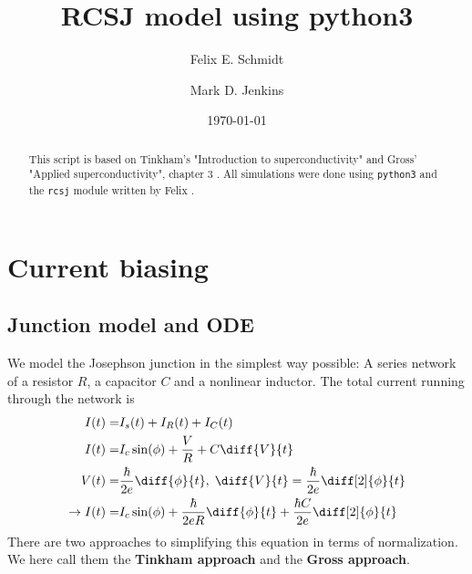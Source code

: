\documentclass[reprint,onecolumn,%
amsmath,amssymb,aip,apl]{revtex4-1}
\begin{document}
	\title{RCSJ model using python3}
	\author{Felix E. Schmidt}
	\author{Mark D. Jenkins}
	\date{\today}

	\begin{abstract}
		This script is based on Tinkham's "Introduction to superconductivity"\cite{tinkham} and Gross' "Applied superconductivity", chapter 3 \cite{gross}.
		All simulations were done using \texttt{python3} and the \texttt{rcsj} module written by Felix \cite{rcsj}.
	\end{abstract}	
	
	\maketitle
	\tableofcontents
	
	
	\section{Current biasing}
	\subsection{Junction model and ODE}
	We model the Josephson junction in the simplest way possible:
	A series network of a resistor $R$, a capacitor $C$ and a nonlinear inductor.
	The total current running through the network is
	\begin{eqnarray}
	I(t) =& I_s(t) + I_R(t) + I_C(t) \\%
	I(t) =& I_c\sin(\phi) + \frac{V}{R} + C\diff{V}{t} \\%
	V(t) =& \frac{\hbar}{2e}\diff{\phi}{t}, \; \diff{V}{t} = \frac{\hbar}{2e} \diff[2]{\phi}{t} \\%
	\rightarrow I(t) =& I_c\sin(\phi)+\frac{\hbar}{2eR}\diff{\phi}{t}+\frac{\hbar C}{2e}\diff[2]{\phi}{t}
	\end{eqnarray}
	There are two approaches to simplifying this equation in terms of normalization.
	We here call them the \textbf{Tinkham approach}\cite{tinkham} and the \textbf{Gross approach}\cite{gross}.
	
	
\end{document}

